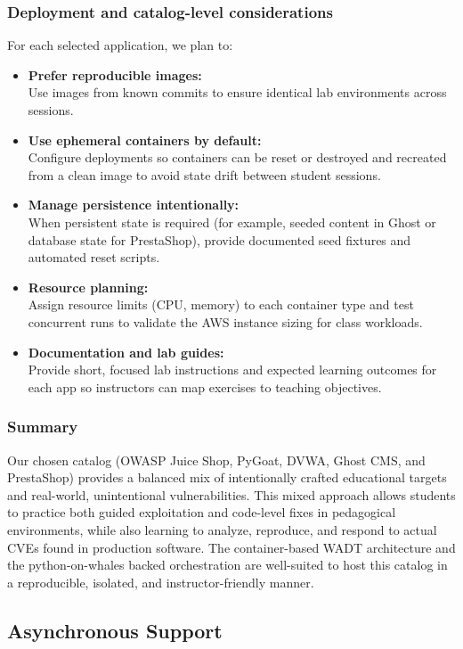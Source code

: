 \documentclass[12pt,titlepage]{article}
\begin{document}
\subsubsection{Deployment and catalog-level considerations}
For each selected application, we plan to:
\begin{itemize}
    \item \textbf{Prefer reproducible images:}\\ Use images from known commits to ensure identical lab environments across sessions.
    \item \textbf{Use ephemeral containers by default:}\\ Configure deployments so containers can be reset or destroyed and recreated from a clean image to avoid state drift between student sessions.
    \item \textbf{Manage persistence intentionally:}\\ When persistent state is required (for example, seeded content in Ghost or database state for PrestaShop), provide documented seed fixtures and automated reset scripts.
    \item \textbf{Resource planning:}\\ Assign resource limits (CPU, memory) to each container type and test concurrent runs to validate the AWS instance sizing for class workloads.
    \item \textbf{Documentation and lab guides:}\\ Provide short, focused lab instructions and expected learning outcomes for each app so instructors can map exercises to teaching objectives.
\end{itemize}

\subsubsection{Summary}
Our chosen catalog (OWASP Juice Shop, PyGoat, DVWA, Ghost CMS, and PrestaShop) provides a balanced mix of intentionally crafted educational targets and real-world, unintentional vulnerabilities. This mixed approach allows students to practice both guided exploitation and code-level fixes in pedagogical environments, while also learning to analyze, reproduce, and respond to actual CVEs found in production software. The container-based WADT architecture and the python-on-whales backed orchestration are well-suited to host this catalog in a reproducible, isolated, and instructor-friendly manner.

\subsection{Asynchronous Support}
\end{document}
